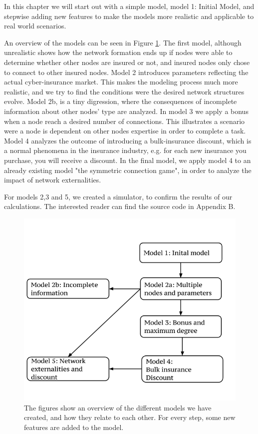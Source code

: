 In this chapter we will start out with a simple model, model 1: Initial Model, and stepwise adding new features to make the models more realistic and applicable to real world scenarios.

An overview of the models can be seen in Figure \ref{fig:Overview-of-models}. The first model, although unrealistic shows how the network formation ends up if nodes were able to determine whether other nodes are insured or not, and insured nodes only chose to connect to other insured nodes. 
Model 2 introduces parameters reflecting the actual cyber-insurance market. This makes the modeling process much more realistic, and we try to find the conditions were the desired network structures evolve. Model 2b, is a tiny digression, where the consequences of incomplete information about other nodes' type are analyzed. 
In model 3 we apply a bonus when a node reach a desired number of connections. This illustrates a scenario were a node is dependent on other nodes expertise in order to complete a task.
Model 4 analyzes the outcome of introducing a bulk-insurance discount, which is a normal phenomena in the insurance industry, e.g. for each new insurance you purchase, you will receive a discount. 
In the final model, we apply model 4 to an already existing model "the symmetric connection game", in order to analyze the impact of network externalities.

 For models 2,3 and 5, we created a simulator, to confirm the results of our calculations. The interested reader can find the source code in Appendix B.
\begin{figure}[h]
\centering
  \includegraphics[width=0.9\linewidth]{../Figures/modeloverview.png}
  \caption[The figures show an overview of the different models we have created, and how they relate to each other.]{\label{fig:Overview-of-models} The figures show an overview of the different models we have created, and how they relate to each other. For every step, some new features are added to the model.}

\end{figure}

